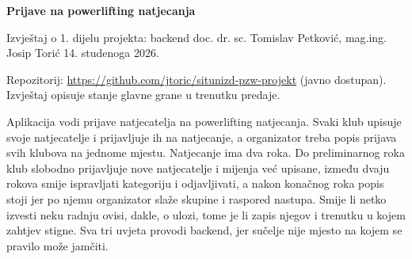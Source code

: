 \documentclass[10pt,a4paper]{article}
\begin{document}
{\color{ink}\fontsize{18}{22}\selectfont\bfseries Prijave na powerlifting natjecanja\par}
\vspace{0.2em}
{\color{muted}Izvještaj o 1. dijelu projekta: backend \textperiodcentered{} doc. dr. sc. Tomislav Petković, mag.ing. Josip Torić \textperiodcentered{} 14. studenoga 2026.\par}

\vspace{0.6em}
Repozitorij: \url{https://github.com/jtoric/situnizd-pzw-projekt} (javno dostupan). Izvještaj opisuje stanje glavne grane u trenutku predaje.

Aplikacija vodi prijave natjecatelja na powerlifting natjecanja. Svaki klub upisuje svoje natjecatelje i prijavljuje ih na natjecanje, a organizator treba popis prijava svih klubova na jednome mjestu. Natjecanje ima dva roka. Do preliminarnog roka klub slobodno prijavljuje nove natjecatelje i mijenja već upisane, između dvaju rokova smije ispravljati kategoriju i odjavljivati, a nakon konačnog roka popis stoji jer po njemu organizator slaže skupine i raspored nastupa. Smije li netko izvesti neku radnju ovisi, dakle, o ulozi, tome je li zapis njegov i trenutku u kojem zahtjev stigne. Sva tri uvjeta provodi backend, jer sučelje nije mjesto na kojem se pravilo može jamčiti.
\end{document}
